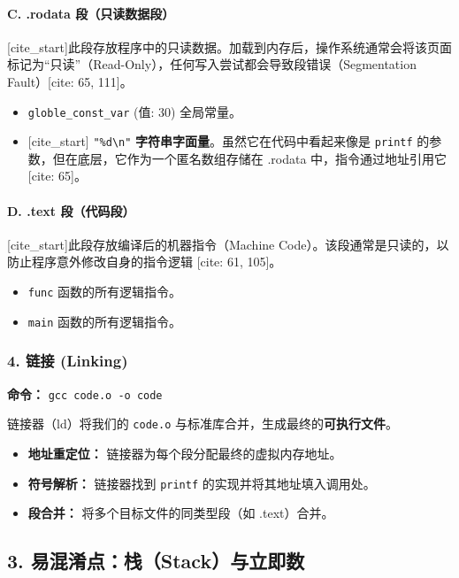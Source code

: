 \paragraph{C. .rodata 段（只读数据段）}
[cite\_start]此段存放程序中的只读数据。加载到内存后，操作系统通常会将该页面标记为“只读”（Read-Only），任何写入尝试都会导致段错误（Segmentation Fault）[cite: 65, 111]。
\begin{itemize}
    \item \texttt{globle\_const\_var} (值: 30) \textendash{} 全局常量。
    \item {[cite\_start]} \texttt{"\%d\textbackslash{}n"} \textendash{} \textbf{字符串字面量}。虽然它在代码中看起来像是 \texttt{printf} 的参数，但在底层，它作为一个匿名数组存储在 .rodata 中，指令通过地址引用它 [cite: 65]。
\end{itemize}

\paragraph{D. .text 段（代码段）}
[cite\_start]此段存放编译后的机器指令（Machine Code）。该段通常是只读的，以防止程序意外修改自身的指令逻辑 [cite: 61, 105]。
\begin{itemize}
    \item \texttt{func} 函数的所有逻辑指令。
    \item \texttt{main} 函数的所有逻辑指令。
\end{itemize}

\subsubsection{4. 链接 (Linking)}
\textbf{命令：} \texttt{gcc code.o -o code}

链接器（ld）将我们的 \texttt{code.o} 与标准库合并，生成最终的\textbf{可执行文件}。
\begin{itemize}
    \item \textbf{地址重定位：} 链接器为每个段分配最终的虚拟内存地址。
    \item \textbf{符号解析：} 链接器找到 \texttt{printf} 的实现并将其地址填入调用处。
    \item \textbf{段合并：} 将多个目标文件的同类型段（如 .text）合并。
\end{itemize}

\subsection{3. 易混淆点：栈（Stack）与立即数}

